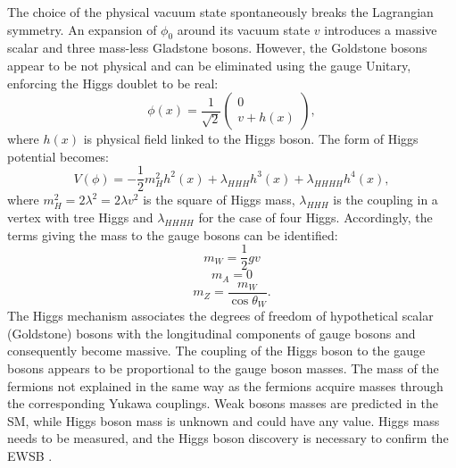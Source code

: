 The choice of the physical vacuum state spontaneously breaks the Lagrangian symmetry. An expansion of $\phi_0$ around its vacuum state $v$ introduces a massive scalar and three mass-less Gladstone bosons. However, the Goldstone bosons appear to be not physical and can be eliminated using the gauge Unitary, enforcing the Higgs doublet to be real:
\begin{equation}
    \phi(x)=\frac{1}{\sqrt{2}}\left(\begin{array}{c}
0 \\
v+h(x)
\end{array}\right),
\end{equation}
where $h(x)$ is physical field linked to the Higgs boson. The form of Higgs potential becomes: \begin{equation}
    V(\phi)=-\frac{1}{2} m_{H}^{2} h^{2}(x)+\lambda_{H H H} h^{3}(x)+\lambda_{H H H H} h^{4}(x),
\end{equation}
where $m_{H}^{2}=2 \lambda^{2}=2 \lambda v^{2}$ is the square of Higgs mass, $\lambda_{HHH}$ is the coupling in a vertex with tree Higgs and $\lambda_{HHHH}$ for the case of four Higgs.
Accordingly, the terms giving the mass to the gauge bosons can be identified:
\begin{equation}
m_{W} = \frac{1}{2}gv 
\end{equation}
\begin{equation}
m_{A} = 0    
\end{equation}
\begin{equation}
m_{Z} = \frac{m_{W}}{\cos\theta_{W}}.
\end{equation}
The Higgs mechanism associates the degrees of freedom of hypothetical scalar (Goldstone) bosons with the longitudinal components of gauge bosons and consequently become massive. The coupling of the Higgs boson to the gauge bosons appears to be proportional to the gauge boson masses. The mass of the fermions not explained in the same way as the fermions acquire masses through the corresponding Yukawa couplings. Weak bosons masses are predicted in the SM, while  Higgs boson mass is unknown and could have any value. Higgs mass needs to be measured, and the Higgs boson discovery is necessary to confirm the EWSB \cite{EWSB}.
